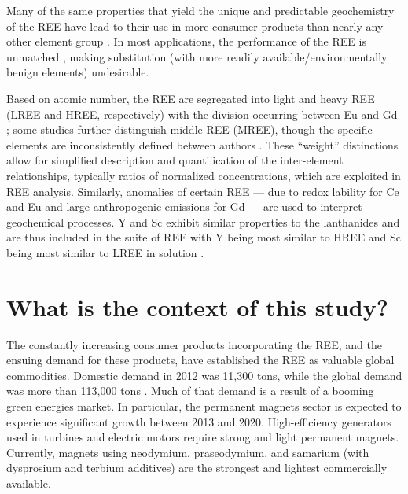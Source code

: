 Many of the same properties that yield the unique and predictable geochemistry of the REE have lead to their use in more consumer products than nearly any other element group \citep{CastorHedrick, Graedel_PNAS_2015}. In most applications, the performance of the REE is unmatched \citep{Ciacci_EST_2015, Nassar_JIE_2015}, making substitution (with more readily available/environmentally benign elements) undesirable.

Based on atomic number, the REE are segregated into light and heavy REE (LREE and HREE, respectively) with the division occurring between Eu and Gd \citep{CastorHedrick};
some studies further distinguish middle REE (MREE), though the specific elements are inconsistently defined between authors \citep{Hannigan_CG_2001, Tang_CG_2010, Choi_CG_2009}.
These ``weight'' distinctions allow for simplified description and quantification of the inter-element relationships, typically ratios of normalized concentrations, which are exploited in REE analysis.
Similarly, anomalies of certain REE --- due to redox lability for Ce and Eu \citep{Brookins_RMG_1989} and large anthropogenic emissions for Gd \citep{Bau_EPSL_1996} --- are used to interpret geochemical processes.
Y and Sc exhibit similar properties to the lanthanides and are thus included in the suite of REE with Y being most similar to HREE and Sc being most similar to LREE in solution \citep{Brookins_RMG_1989}. 

\section{What is the context of this study?}

The constantly increasing consumer products incorporating the REE, and the ensuing demand for these products, have established the REE as valuable global commodities.
Domestic demand in 2012 was 11,300 tons, while the global demand was more than 113,000 tons \citep{FrostSullivan_REEmarket}.
Much of that demand is a result of a booming green energies market.
In particular, the permanent magnets sector is expected to experience significant growth between 2013 and 2020.
High-efficiency generators used in turbines and electric motors require strong and light permanent magnets.
Currently, magnets using neodymium, praseodymium, and samarium (with dysprosium and terbium additives) are the strongest and lightest commercially available.

